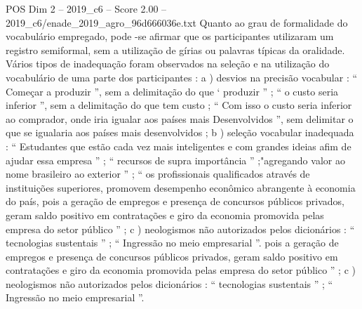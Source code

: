 \begin{textsample}{POS Dim 2 – 2019\_c6 – Score 2.00 – 2019\_c6/enade\_2019\_agro\_96d666036e.txt}
Quanto ao grau de formalidade do vocabulário empregado, pode -se afirmar que os participantes utilizaram um registro semiformal, sem a utilização de gírias ou palavras típicas da oralidade.
Vários tipos de inadequação foram observados na seleção e na utilização do vocabulário de uma parte dos participantes : a ) desvios na precisão vocabular : “ Começar a produzir ”, sem a delimitação do que ‘ produzir ” ; “ o custo seria inferior ”, sem a delimitação do que tem custo ; “ Com isso o custo seria inferior ao comprador, onde iria igualar aos países mais Desenvolvidos ”, sem delimitar o que se igualaria aos países mais desenvolvidos ; b ) seleção vocabular inadequada : “ Estudantes que estão cada vez mais inteligentes e com grandes ideias afim de ajudar essa empresa ” ; “ recursos de supra importância ” ;"agregando valor ao nome brasileiro ao exterior ” ; “ os profissionais qualificados através de instituições superiores, promovem desempenho econômico abrangente à economia do país, pois a geração de empregos e presença de concursos públicos privados, geram saldo positivo em contratações e giro da economia promovida pelas empresa do setor público ” ; c ) neologismos não autorizados pelos dicionários : “ tecnologias sustentais ” ; “ Ingressão no meio empresarial ”. pois a geração de empregos e presença de concursos públicos privados, geram saldo positivo em contratações e giro da economia promovida pelas empresa do setor público ” ; c ) neologismos não autorizados pelos dicionários : “ tecnologias sustentais ” ; “ Ingressão no meio empresarial ”.

\end{textsample}
